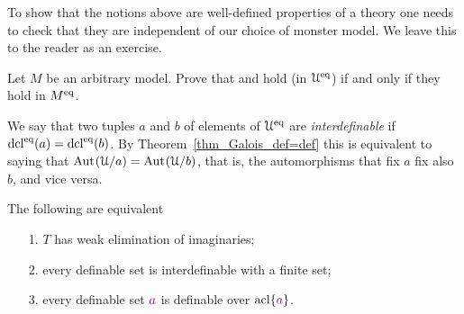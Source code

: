 \documentclass[creche.tex]{subfiles}
\begin{document}
To show that the notions above are well-defined properties of a theory one needs to check that they are independent of our choice of monster model. We leave this to the reader as an exercise.

\begin{exercise}
Let $M$ be an arbitrary model. Prove that  and  hold (in $\EuScript U^{{\rm eq}}$) if and only if they hold in $M^{{\rm eq}}$.\QED
\end{exercise}

We say that two tuples $a$ and $b$ of elements of $\EuScript U^{{\rm eq}}$ are \emph{interdefinable\/} if $\mathop{\rm dcl}^{{\rm eq}}(a)=\mathop{\rm dcl}^{{\rm eq}}(b)$. By Theorem~\ref{thm_Galois_def=def} this is equivalent to saying that $\textrm{Aut\kern.15ex}(\EuScript U/a)=\textrm{Aut\kern.15ex}(\EuScript U/b)$, that is, the automorphisms that fix $a$ fix also $b$, and vice versa.

\begin{theorem}\label{elimimd}
The following are equivalent
\begin{itemize}
\item[1.] $T$ has weak elimination of imaginaries;
\item[2.] every definable set is interdefinable with a finite set;
\item[3.] every definable set ${\color{violet} a}$ is definable over $\mathop{\rm acl}\{{\color{violet} a}\}$.
\end{itemize}
\end{theorem}
\end{document}
